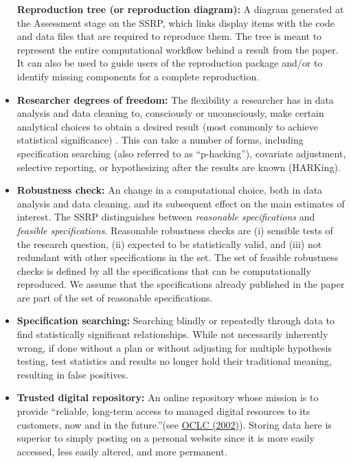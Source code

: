 \documentclass[
]{book}
\begin{document}
\begin{itemize}
  \textbf{Reproduction tree (or reproduction diagram):} A diagram generated at the Assessment stage on the SSRP, which links display items with the code and data files that are required to reproduce them. The tree is meant to represent the entire computational workflow behind a result from the paper. It can also be used to guide users of the reproduction package and/or to identify missing components for a complete reproduction.
\item
  \textbf{Researcher degrees of freedom:} The flexibility a researcher has in data analysis and data cleaning to, consciously or unconsciously, make certain analytical choices to obtain a desired result (most commonly to achieve statistical significance) . This can take a number of forms, including specification searching (also referred to as ``p-hacking''), covariate adjustment, selective reporting, or hypothesizing after the results are known (HARKing).
\item
  \textbf{Robustness check:} An change in a computational choice, both in data analysis and data cleaning, and its subsequent effect on the main estimates of interest. The SSRP distinguishes between \emph{reasonable specifications} and \emph{feasible specifications}. Reasonable robustness checks \citep{simonsohn2019specification} are (i) sensible tests of the research question, (ii) expected to be statistically valid, and (iii) not redundant with other specifications in the set. The set of feasible robustness checks is defined by all the specifications that can be computationally reproduced. We assume that the specifications already published in the paper are part of the set of reasonable specifications.
\item
  \textbf{Specification searching:} Searching blindly or repeatedly through data to find statistically significant relationships. While not necessarily inherently wrong, if done without a plan or without adjusting for multiple hypothesis testing, test statistics and results no longer hold their traditional meaning, resulting in false positives.
\item
  \textbf{Trusted digital repository:} An online repository whose mission is to provide ``reliable, long-term access to managed digital resources to its customers, now and in the future.''(see \href{https://www.oclc.org/research/archive/projects/trustedrep.html}{OCLC (2002)}). Storing data here is superior to simply posting on a personal website since it is more easily accessed, less easily altered, and more permanent.
\end{itemize}

  
\end{document}
